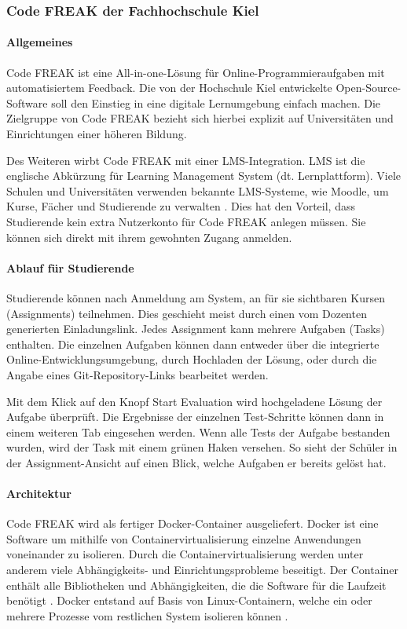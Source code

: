 \newpage
\subsubsection{Code FREAK der Fachhochschule Kiel}\label{code-freak}
\paragraph{Allgemeines}
Code FREAK ist eine All-in-one-Lösung für Online-Programmieraufgaben mit
automatisiertem Feedback. Die von der Hochschule Kiel entwickelte
Open-Source-Software soll den Einstieg in eine digitale Lernumgebung einfach
machen. Die Zielgruppe von Code FREAK bezieht sich hierbei explizit auf
Universitäten und Einrichtungen einer höheren Bildung.
\parencite{codefreak-startseite}

Des Weiteren wirbt Code FREAK mit einer LMS-Integration. LMS ist die englische
Abkürzung für Learning Management System (dt. Lernplattform). Viele Schulen und
Universitäten verwenden bekannte LMS-Systeme, wie Moodle, um Kurse, Fächer und
Studierende zu verwalten \parencite{moodle}.
Dies hat den Vorteil, dass Studierende kein extra Nutzerkonto für Code FREAK
anlegen müssen. Sie können sich direkt mit ihrem gewohnten Zugang anmelden.

\paragraph{Ablauf für Studierende}
Studierende können nach Anmeldung am System, an für sie sichtbaren Kursen
(Assignments) teilnehmen. Dies geschieht meist durch einen vom Dozenten
generierten Einladungslink. Jedes Assignment kann mehrere Aufgaben (Tasks)
enthalten. Die einzelnen Aufgaben können dann entweder über die integrierte
Online-Entwicklungsumgebung, durch Hochladen der Lösung, oder durch die Angabe
eines Git-Repository-Links bearbeitet werden.

Mit dem Klick auf den Knopf \glqq Start Evaluation\grqq{} wird hochgeladene
Lösung der Aufgabe überprüft. Die Ergebnisse der einzelnen Test-Schritte können
dann in einem weiteren Tab eingesehen werden. Wenn alle Tests der Aufgabe
bestanden wurden, wird der Task mit einem grünen Haken versehen. So sieht der
Schüler in der Assignment-Ansicht auf einen Blick, welche Aufgaben er bereits
gelöst hat.

\paragraph{Architektur}
Code FREAK wird als fertiger Docker-Container ausgeliefert. Docker ist eine
Software um mithilfe von Containervirtualisierung einzelne Anwendungen
voneinander zu isolieren. Durch die Containervirtualisierung werden unter
anderem viele Abhängigkeits- und Einrichtungsprobleme beseitigt. Der Container
enthält alle Bibliotheken und Abhängigkeiten, die die Software für die Laufzeit
benötigt \parencite{docker}. Docker entstand auf Basis von Linux-Containern, welche
ein oder mehrere Prozesse vom restlichen System isolieren können 
\parencite{linux-container}.

